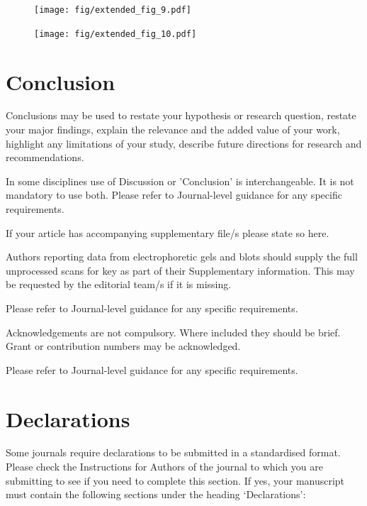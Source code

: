 \documentclass[sn-mathphys-num]{sn-jnl}%
\theoremstyle{thmstyleone}%
\theoremstyle{thmstyletwo}%
\theoremstyle{thmstylethree}%
\begin{document}
\begin{figure}[!htb] 
	\centering
	\texttt{[image: fig/extended\_fig\_9.pdf]}
	\caption{}
	\label{fig:extended_fig_9}
\end{figure}


\begin{figure}[!htb] 
	\centering
	\texttt{[image: fig/extended\_fig\_10.pdf]}
	\caption{}
	\label{fig:extended_fig_10}
\end{figure}



\section{Conclusion}\label{sec13}

Conclusions may be used to restate your hypothesis or research question, restate your major findings, explain the relevance and the added value of your work, highlight any limitations of your study, describe future directions for research and recommendations. 

In some disciplines use of Discussion or 'Conclusion' is interchangeable. It is not mandatory to use both. Please refer to Journal-level guidance for any specific requirements. 

\backmatter


If your article has accompanying supplementary file/s please state so here. 

Authors reporting data from electrophoretic gels and blots should supply the full unprocessed scans for key as part of their Supplementary information. This may be requested by the editorial team/s if it is missing.

Please refer to Journal-level guidance for any specific requirements.


Acknowledgements are not compulsory. Where included they should be brief. Grant or contribution numbers may be acknowledged.

Please refer to Journal-level guidance for any specific requirements.

\section*{Declarations}

Some journals require declarations to be submitted in a standardised format. Please check the Instructions for Authors of the journal to which you are submitting to see if you need to complete this section. If yes, your manuscript must contain the following sections under the heading `Declarations':
\end{document}
